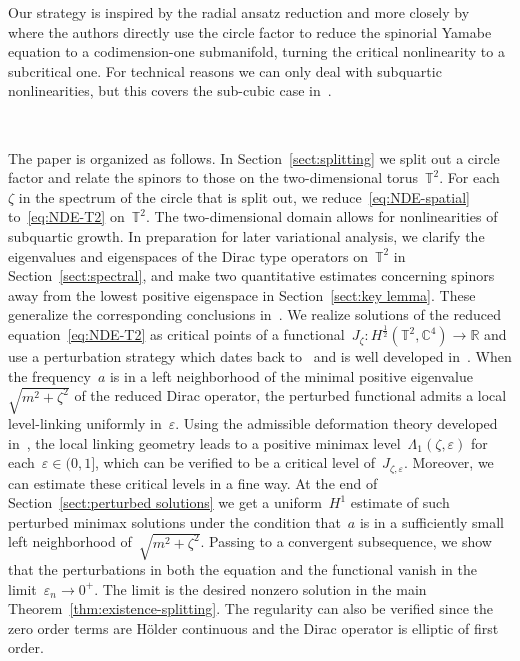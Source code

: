 \documentclass[10pt,a4paper]{amsart}
\newcommand{\R}{\mathbb{R}}
\newcommand{\C}{\mathbb{C}}
\newcommand{\T}{\mathbb{T}}
\newcommand{\eps}{\varepsilon}
\begin{document}
Our strategy is inspired by the radial ansatz reduction and more closely by~\cite{SireXu2023variational} where the authors directly use the circle factor to reduce the spinorial Yamabe equation to a codimension-one submanifold, turning the critical nonlinearity to a subcritical one. 
For technical reasons we can only deal with subquartic nonlinearities, but this covers the sub-cubic case in~\cite{WZ2026Stationary}. 

\ 

The paper is organized as follows. 
In Section~\ref{sect:splitting} we split out a circle factor and relate the spinors to those on the two-dimensional torus~$\T^2$.
For each~$\zeta$ in the spectrum of the circle that is split out, we reduce~\eqref{eq:NDE-spatial} to~\eqref{eq:NDE-T2} on~$\T^2$. 
The two-dimensional domain allows for nonlinearities of subquartic growth. 
In preparation for later variational analysis, we clarify the eigenvalues and eigenspaces of the Dirac type operators on~$\T^2$ in Section~\ref{sect:spectral}, and make two quantitative estimates concerning spinors away from the lowest positive eigenspace in Section~\ref{sect:key lemma}. 
These generalize the corresponding conclusions in~\cite{WZ2026Stationary}. 
We realize solutions of the reduced equation~\eqref{eq:NDE-T2} as critical points of a functional~$J_\zeta\colon H^{\frac{1}{2}}(\T^2,\C^4)\to\R$ and use a perturbation strategy which dates back to~\cite{EstebanSere1995stationary} and is well developed in~\cite{WZ2026Stationary}.
When the frequency~$a$ is in a left neighborhood of the minimal positive eigenvalue~$\sqrt{m^2+\zeta^2}$ of the reduced Dirac operator, the perturbed functional admits a local level-linking uniformly in~$\eps$.
Using the admissible deformation theory developed in~\cite{WZ2026Stationary}, the local linking geometry leads to a positive minimax level~$\Lambda_1(\zeta,\eps)$ for each~$\eps\in (0,1]$, which can be verified to be a critical level of~$J_{\zeta,\eps}$.
Moreover, we can estimate these critical levels in a fine way. 
At the end of Section~\ref{sect:perturbed solutions} we get a uniform~$H^1$ estimate of such perturbed minimax solutions under the condition that~$a$ is in a sufficiently small left neighborhood of~$\sqrt{m^2+\zeta^2}$. 
Passing to a convergent subsequence, we show that the perturbations in both the equation and the functional vanish in the limit~$\eps_n\to 0^+$. 
The limit is the desired nonzero solution in the main Theorem~\ref{thm:existence-splitting}. 
The regularity can also be verified since the zero order terms are H\"older continuous and the Dirac operator is elliptic of first order. 
\end{document}
